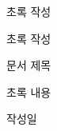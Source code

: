 \documentclass[ aspectratio=149,  14pt,blue,xcolor=pdftex,dvipsnames,table,handout,notes]{beamer}
\begin{document}














		\begin{frame}[t]{초록 작성}

			\begin{block} {초록 작성}
			\begin{description}[12345678901234567]
			\item [\textbackslash begin\{abstract\}] 	문서 제목
			\item [초록 내용]						초록 내용
			\item [\textbackslash end\{abstract\}] 	작성일
			\end{description}
			\end{block}


		\end{frame}
\end{document}
